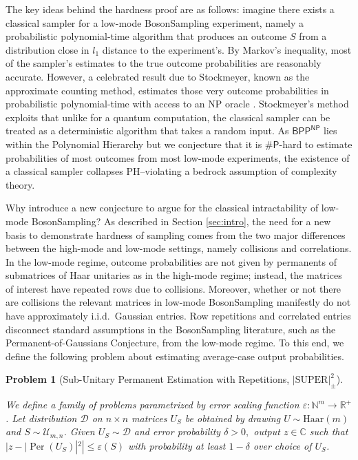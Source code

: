 \documentclass[11pt]{article}
\theoremstyle{plain}
\theoremstyle{plain}
\theoremstyle{plain}
\theoremstyle{plain}
\theoremstyle{plain}
\theoremstyle{plain}
\theoremstyle{plain}
\theoremstyle{remark}
\theoremstyle{remark}
\theoremstyle{plain}
\theoremstyle{plain}
\theoremstyle{plain}
\theoremstyle{plain}
\newtheorem{problem}{Problem}
\newcommand{\Per}{\operatorname{Per}}
\newcommand{\Haar}{\mathrm{Haar}}
\newcommand{\superap}{\lvert \mathrm{SUPER}\rvert^2_\pm}
\newcommand{\sharP}{\#\mathsf{P}}
\begin{document}
The key ideas behind the hardness proof are as follows: imagine there exists a classical sampler for a low-mode BosonSampling experiment, namely a probabilistic polynomial-time algorithm that produces an outcome $S$ from a distribution close in $l_1$ distance to the experiment's. By Markov's inequality, most of the sampler's estimates to the true outcome probabilities are reasonably accurate. However, a celebrated result due to Stockmeyer, known as the approximate counting method, estimates those very outcome probabilities in probabilistic polynomial-time with access to an \textsf{NP} oracle \cite{stockmeyer1983complexity}. Stockmeyer's method exploits that unlike for a quantum computation, the classical sampler can be treated as a deterministic algorithm that takes a random input. As $\mathsf{BPP}^\mathsf{NP}$ lies within the Polynomial Hierarchy but we conjecture that it is $\sharP$-hard to estimate probabilities of most outcomes from most low-mode experiments, the existence of a classical sampler collapses \textsf{PH}--violating a bedrock assumption of complexity theory. 

Why introduce a new conjecture to argue for the classical intractability of low-mode BosonSampling? As described in Section \ref{sec:intro}, the need for a new basis to demonstrate hardness of sampling comes from the two major differences between the high-mode and low-mode settings, namely collisions and correlations. In the low-mode regime, outcome probabilities are not given by permanents of submatrices of Haar unitaries as in the high-mode regime; instead, the matrices of interest have repeated rows due to collisions. Moreover, whether or not there are collisions the relevant matrices in low-mode BosonSampling manifestly do not have approximately i.i.d.\ Gaussian entries. Row repetitions and correlated entries disconnect standard assumptions in the BosonSampling literature, such as the Permanent-of-Gaussians Conjecture, from the low-mode regime. 
To this end, we define the following problem about estimating average-case output probabilities. 

\begin{problem}[Sub-Unitary Permanent Estimation with Repetitions, $\superap$]
\label{prob:super}


We define a family of problems parametrized by error scaling function $\varepsilon \colon \mathbb N^m \to \mathbb R^+$. Let distribution $\mathcal{D}$ on $n\times n$ matrices $U_S$ be obtained by drawing $U\sim\Haar(m)$ and $S\sim\mathcal U_{m,n}$. Given $U_S\sim\mathcal{D}$ and error probability $\delta>0,$ output $z\in\mathbb{C}$ such that $|z - |\Per(U_S)|^2 | \le \varepsilon(S)$
with probability at least $1 - \delta$ over choice of $U_S$.
\end{problem}
\end{document}
